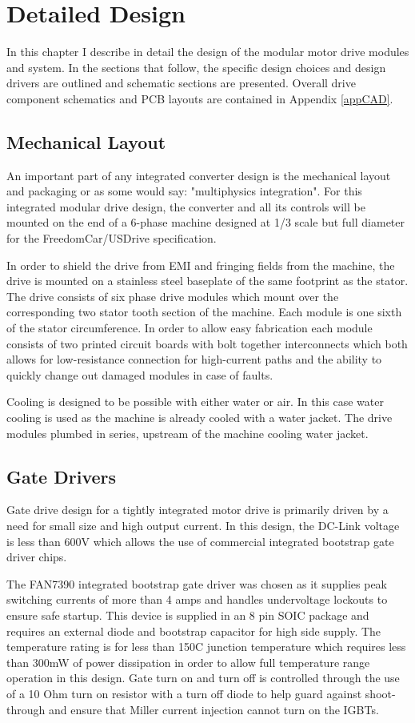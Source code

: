\chapter{Detailed Design}
In this chapter I describe in detail the design of the modular motor drive
modules and system.
In the sections that follow, the specific design choices and design drivers
are outlined and schematic sections are presented.
Overall drive component schematics and PCB layouts are contained in Appendix
\ref{appCAD}.

\section{Mechanical Layout}
An important part of any integrated converter design is the mechanical layout
and packaging or as some would say: "multiphysics integration".
For this integrated modular drive design, the converter and all its controls
will be mounted on the end of a 6-phase machine designed at 1/3 scale but full
diameter for the FreedomCar/USDrive specification.

In order to shield the drive from EMI and fringing fields from the machine,
the drive is mounted on a stainless steel baseplate of the same footprint as
the stator.
The drive consists of six phase drive modules which mount over the
corresponding two stator tooth section of the machine.
Each module is one sixth of the stator circumference.
In order to allow easy fabrication each module consists of two printed circuit
boards with bolt together interconnects which both allows for low-resistance
connection for high-current paths and the ability to quickly change out
damaged modules in case of faults.

Cooling is designed to be possible with either water or air.
In this case water cooling is used as the machine is already cooled with a
water jacket.
The drive modules plumbed in series, upstream of the machine cooling water
jacket.

\section{Gate Drivers}
Gate drive design for a tightly integrated motor drive is primarily driven by
a need for small size and high output current.
In this design, the DC-Link voltage is less than 600V which allows the use of
commercial integrated bootstrap gate driver chips.

The FAN7390 integrated bootstrap gate driver was chosen as it supplies peak
switching currents of more than 4 amps and handles undervoltage lockouts to
ensure safe startup.
This device is supplied in an 8 pin SOIC package and requires an external
diode and bootstrap capacitor for high side supply.
The temperature rating is for less than 150C junction temperature which
requires less than 300mW of power dissipation in order to allow full
temperature range operation in this design.
Gate turn on and turn off is controlled through the use of a 10 Ohm turn on
resistor with a turn off diode to help guard against shoot-through and ensure
that Miller current injection cannot turn on the IGBTs.

